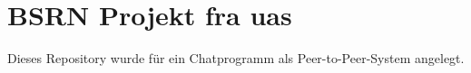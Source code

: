 \chapter{BSRN Projekt fra uas}
\hypertarget{md_README}{}\label{md_README}
\label{md_README_autotoc_md0}%
%
Dieses Repository wurde für ein Chatprogramm als Peer-\/to-\/\+Peer-\/\+System angelegt. 